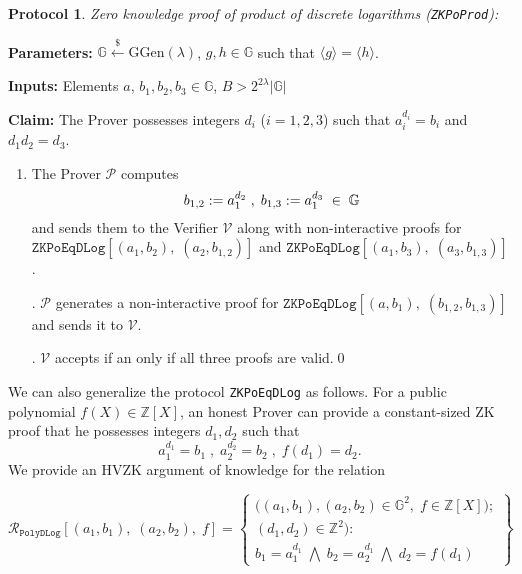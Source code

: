 \documentclass[11pt, lettersize, notitlepage, leqno, footskip=0.6cm]{article}
\newcommand{\bz}{\mathbb Z}
\newcommand{\ttt}{\texttt}
\newcommand{\bG}{\mathbb{G}}
\newcommand{\la}{\langle}
\newcommand{\ra}{\rangle}
\newcommand{\mc}{\mathcal}
\newcommand{\mb}{\mathbb}
\newcommand{\mr}{\mathrm}
\newcommand{\lam}{\lambda}
\newcommand{\lamb}{\lambda}
\newcommand{\mP}{\mc{P}}
\newcommand{\V}{\mc{V}}
\newcommand{\vs}{\vspace{-0.15cm}}
\newcommand{\noin}{\noindent}
\newtheorem{Prot}[Thm]{Protocol}
\numberwithin{equation}{section}
\begin{document}
\vspace{0.1cm}

\begin{Prot} \normalfont \hypertarget{PoProd}{\textit{Zero knowledge proof of product of discrete logarithms}} (\verb|ZKPoProd|):\end{Prot} \vspace{-0.3cm}

\noin \textbf{Parameters:} $\mb{G}\xleftarrow{\$} \mr{GGen}(\lamb)$,  $g,h\in \mb{G}$ such that $\la g \ra = \la h \ra$.

\noin \textbf{Inputs:} Elements $a$, $b_1, b_2, b_3 \in \mb{G}$, $B > 2^{2\lam}|\bG|$

\noin \textbf{Claim:} The Prover possesses integers $d_i$ ($i=1,2,3$) such that $a_i^{d_i} = b_i$ and $d_1d_2 = d_3$.

\begin{enumerate}[wide, labelwidth=!, labelindent=0pt]\vs \item The Prover $\mP$ computes \vs $$b_{1,2}:= a_1^{d_2}\;,\; b_{1,3}:= a_1^{d_3}\;\in\;\bG \vs $$ and sends them to the Verifier $\V$ along with non-interactive proofs for $\ttt{ZKPoEqDLog}[(a_1,b_2),\;(a_2,b_{1,2})]$ and $\ttt{ZKPoEqDLog}[(a_1,b_3),\;(a_3,b_{1,3})]$.

\noin 2. $\mP$ generates a non-interactive proof for $\ttt{ZKPoEqDLog}[(a, b_1),\;(b_{1,2}, b_{1,3})]$ and sends it to $\V$.

\noin 3. $\V$ accepts if an only if all three proofs are valid.\qed\end{enumerate}



\noin We can also generalize the protocol \verb|ZKPoEqDLog| as follows. For a public polynomial {$f(X)\in \bz[X]$}, an honest Prover can provide a constant-sized ZK proof that he possesses integers $d_1,d_2$ such that \vs $$a_1^{d_1} = b_1\;,\;a_2^{d_2} = b_2\;,\;f(d_1) = d_2. $$ We provide an HVZK argument of knowledge for the relation \vs

\[
  \mc{R}_{{\ttt{PolyDLog}}}[(a_1, b_1),\;(a_2,b_2),\;f] = \left\{\begin{array}{l}
    \big((a_1, b_1), (a_2,b_2)\in\mb{G}^2,\;f\in\bz[X]\big);\\
    (d_1, d_2)\in\mb{Z}^2): \\
    b_1 = a_1^{d_1}\; \bigwedge\; b_2 = a_2^{d_1}\; \bigwedge \;d_2 = f(d_1)
  \end{array}\right\}
\] 

\vspace{0.1cm}
\end{document}
